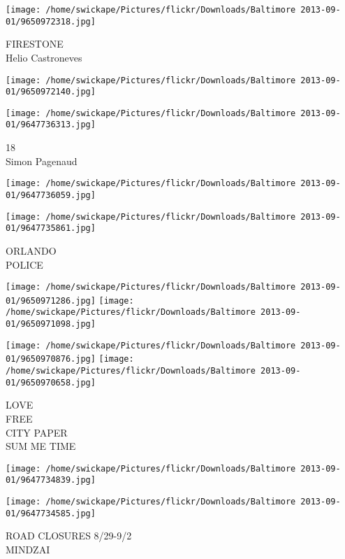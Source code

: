 \documentclass[10pt,letterpaper]{article}
\begin{document}
\vspace{0.25in}
\texttt{[image: /home/swickape/Pictures/flickr/Downloads/Baltimore 2013-09-01/9650972318.jpg]}

FIRESTONE\\
Helio Castroneves\\
\pagebreak

\texttt{[image: /home/swickape/Pictures/flickr/Downloads/Baltimore 2013-09-01/9650972140.jpg]}

\vspace{0.25in}
\texttt{[image: /home/swickape/Pictures/flickr/Downloads/Baltimore 2013-09-01/9647736313.jpg]}

18\\
Simon Pagenaud\\
\pagebreak

\texttt{[image: /home/swickape/Pictures/flickr/Downloads/Baltimore 2013-09-01/9647736059.jpg]}

\vspace{0.25in}
\texttt{[image: /home/swickape/Pictures/flickr/Downloads/Baltimore 2013-09-01/9647735861.jpg]}

ORLANDO\\
POLICE\\
\pagebreak

\texttt{[image: /home/swickape/Pictures/flickr/Downloads/Baltimore 2013-09-01/9650971286.jpg]}
\texttt{[image: /home/swickape/Pictures/flickr/Downloads/Baltimore 2013-09-01/9650971098.jpg]}

\texttt{[image: /home/swickape/Pictures/flickr/Downloads/Baltimore 2013-09-01/9650970876.jpg]}
\texttt{[image: /home/swickape/Pictures/flickr/Downloads/Baltimore 2013-09-01/9650970658.jpg]}

LOVE\\
FREE\\
CITY PAPER\\
SUM ME TIME\\
\pagebreak

\texttt{[image: /home/swickape/Pictures/flickr/Downloads/Baltimore 2013-09-01/9647734839.jpg]}

\vspace{0.25in}
\texttt{[image: /home/swickape/Pictures/flickr/Downloads/Baltimore 2013-09-01/9647734585.jpg]}

ROAD CLOSURES 8/29{-}9/2\\
MINDZAI\\
\pagebreak
\end{document}

